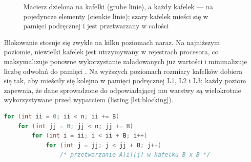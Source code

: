 \documentclass[a4paper,12pt]{book} %
\begin{document}
\begin{figure}[t!]
\centering
{}
\caption{Macierz dzielona na kafelki (grube linie), a każdy kafelek --- na pojedyncze elementy (cienkie linie); szary kafelek mieści się w pamięci podręcznej i jest przetwarzany w całości}
\label{rys:tiling}
\end{figure}

Blokowanie stosuje się zwykle na kilku poziomach naraz. Na najniższym poziomie, niewielki kafelek jest utrzymywany w rejestrach procesora, co maksymalizuje ponowne wykorzystanie załadowanych już wartości i minimalizuje liczbę odwołań do pamięci \cite{goto2008anatomy}. Na wyższych poziomach rozmiary kafelków dobiera się tak, aby mieściły się kolejno w pamięci podręcznej L1, L2 i L3; każdy poziom zapewnia, że dane sprowadzone do odpowiadającej mu warstwy są wielokrotnie wykorzystywane przed wyparciem (listing \ref{lst:blocking}).

\begin{lstfloat}[t!]
\begin{lstlisting}[language=C, caption={Szkic struktury pętli z blokowaniem: obliczenia wykonywane są kafelkami o boku $B$, mieszczącymi się w pamięci podręcznej. Zysk z blokowania pojawia się dopiero przy danych używanych wielokrotnie (jak w mnożeniu macierzy czy transpozycji), a nie przy pojedynczym przejściu pokazanym dla zwięzłości}, label={lst:blocking}]
for (int ii = 0; ii < n; ii += B)
    for (int jj = 0; jj < n; jj += B)
        for (int i = ii; i < ii + B; i++)
            for (int j = jj; j < jj + B; j++)
                /* przetwarzanie A[i][j] w kafelku B x B */
\end{lstlisting}
\end{lstfloat}
\end{document}
